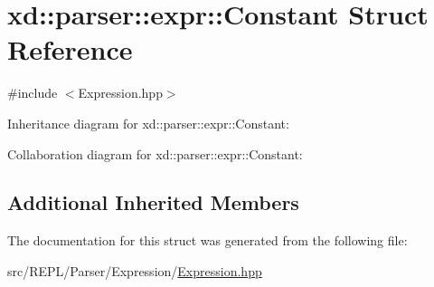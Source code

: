 \hypertarget{structxd_1_1parser_1_1expr_1_1_constant}{}\section{xd\+:\+:parser\+:\+:expr\+:\+:Constant Struct Reference}
\label{structxd_1_1parser_1_1expr_1_1_constant}


{\ttfamily \#include $<$Expression.\+hpp$>$}



Inheritance diagram for xd\+:\+:parser\+:\+:expr\+:\+:Constant\+:


Collaboration diagram for xd\+:\+:parser\+:\+:expr\+:\+:Constant\+:
\subsection*{Additional Inherited Members}


The documentation for this struct was generated from the following file\+:\begin{DoxyCompactItemize}
\item 
src/\+R\+E\+P\+L/\+Parser/\+Expression/\mbox{\hyperlink{_expression_8hpp}{Expression.\+hpp}}\end{DoxyCompactItemize}
